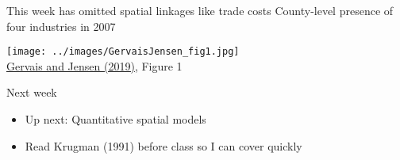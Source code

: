 \documentclass[11pt,notes=hide,aspectratio=169]{beamer}
\begin{document}
\begin{frame}{This week has omitted spatial linkages like trade costs}
County-level presence of four industries in 2007
\begin{center}
\texttt{[image: ../images/GervaisJensen\_fig1.jpg]} \\
{\footnotesize \href{https://doi.org/10.1016/j.jinteco.2019.03.003}{Gervais and Jensen (2019)}, Figure 1}
\end{center}
\end{frame}
\begin{frame}{Next week}
\begin{itemize}
\item Up next: Quantitative spatial models
\item Read Krugman (1991) before class so I can cover quickly
\end{itemize}
\end{frame}
\end{document}
